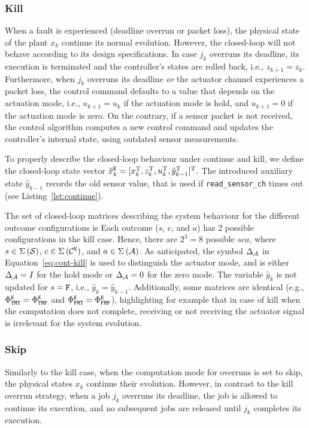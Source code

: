 \subsubsection*{Kill}
%
When a fault is experienced (deadline overrun or packet loss), the physical state of the plant $x_k$ continue its normal evolution.
However, the closed-loop will not behave according to its design specifications.
In case $j_k$ overruns its deadline, its execution is terminated and the controller's states are rolled back, i.e., $z_{k+1} = z_k$.
Furthermore, when $j_k$ overruns its deadline \emph{or} the actuator channel experiences a packet loss, the control command defaults to a value that depends on the actuation mode, i.e., $u_{k+1} = u_k$ if the actuation mode is hold, and $u_{k+1} = 0$ if the actuation mode is zero.
On the contrary, if a sensor packet is not received, the control algorithm computes a new control command and updates the controller's internal state, using outdated sensor measurements.

To properly describe the closed-loop behaviour under continue and kill, we define the closed-loop state vector 
%
$\tilde x_k^{\texttt{K}} = [ x_k^{\mathrm{\small{T}}}{}, z_k^{\mathrm{\small{T}}}{}, u_k^{\mathrm{\small{T}}}{}, \hat y_{k-1}^{\mathrm{\small{T}}}{} ]^{\mathrm{\small{T}}}{}.$
%
The introduced auxiliary state $\hat y_{k-1}$ records the old sensor value, that is used if \texttt{read\_sensor\_ch} times out (see Listing~\ref{lst:continue}).

The set of closed-loop matrices describing the system behaviour for the different outcome configurations is 
%
Each outcome ($s$, $c$, and $a$) has $2$ possible configurations in the kill case.
Hence, there are $2^3 = 8$ possible $sca$, where $s \in \Sigma\left( \mathcal{S} \right)$, $c \in \Sigma\,({\mathcal{C}^{\texttt{K}}})$, and $a \in \Sigma\left( \mathcal{A} \right)$.
As anticipated, the symbol $\Delta_{\mathcal{A}}$ in Equation~\eqref{eq:cont-kill} is used to distinguish the actuator mode, and is either $\Delta_{\mathcal{A}} = I$ for the hold mode or $\Delta_{\mathcal{A}} = 0$ for the zero mode.
The variable $\hat y_k$ is not updated for $s = \texttt{F}$, i.e., $\hat y_k = \hat y_{k-1}$.
Additionally, some matrices are identical (e.g., $\Phi^{\texttt{K}}_{\texttt{T}\texttt{M}\texttt{T}}=\Phi^{\texttt{K}}_{\texttt{T}\texttt{M}\texttt{F}}$ and $\Phi^{\texttt{K}}_{\texttt{F}\texttt{M}\texttt{T}}=\Phi^{\texttt{K}}_{\texttt{F}\texttt{M}\texttt{F}}$), highlighting for example that in case of kill when the computation does not complete, receiving or not receiving the actuator signal is irrelevant for the system evolution.

\subsubsection*{Skip}
Similarly to the kill case, when the computation mode for overruns is set to skip, the physical states $x_k$ continue their evolution.
However, in contrast to the kill overrun strategy, when a job $j_k$ overruns its deadline, the job is allowed to continue its execution, and no subsequent jobs are released until $j_k$ completes its execution.

